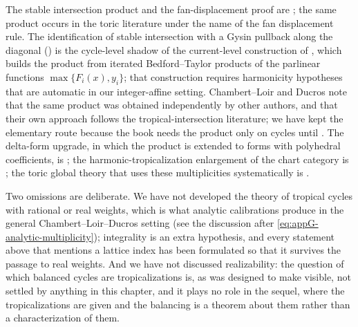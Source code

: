 The stable intersection product and the fan-displacement proof are
\cite[\S4.3]{MR18Tropical}; the same product occurs in the toric literature
under the name of the fan displacement rule.  The identification of stable
intersection with a Gysin pullback along the diagonal
() is the cycle-level shadow of the
current-level construction of \cite[\S\S9.5--9.6]{CLD25}, which builds the
product from iterated Bedford--Taylor products of the parlinear functions
$\max\{F_i(x),y_i\}$; that construction requires harmonicity hypotheses that
are automatic in our integer-affine setting.  Chambert--Loir and Ducros note
that the same product was obtained independently by other authors, and that
their own approach follows the tropical-intersection literature; we have kept
the elementary route because the book needs the product only on cycles until
.  The delta-form upgrade, in which the product is
extended to forms with polyhedral coefficients, is
\cite{GK17,GK19}; the harmonic-tropicalization enlargement of the chart
category is \cite{GJR26}; the toric global theory that uses these
multiplicities systematically is \cite{BGJKK25}.

Two omissions are deliberate.  We have not developed the theory of tropical
cycles with rational or real weights, which is what analytic calibrations
produce in the general Chambert--Loir--Ducros setting
(see the discussion after \eqref{eq:appG-analytic-multiplicity}); integrality
is an extra hypothesis, and every statement above that mentions a lattice
index has been formulated so that it survives the passage to real weights.
And we have not discussed realizability: the question of which balanced
cycles are tropicalizations is, as  was designed
to make visible, not settled by anything in this chapter, and it plays no
role in the sequel, where the tropicalizations are given and the balancing is
a theorem about them rather than a characterization of them.
